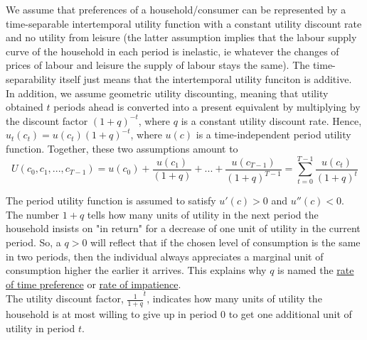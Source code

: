 \documentclass[a4paper, 12pt, reqno]{article}
\begin{document}
We assume that preferences of a household/consumer can be represented by a time-separable intertemporal utility function with a constant utility discount rate and no utility from 
leisure (the latter assumption implies that the labour supply curve of the household in each period is inelastic, ie whatever the changes of prices of labour and leisure the supply of labour stays the same). 
The time-separability itself just means that the intertemporal utility funciton is additive.  \\ 
In addition, we assume geometric utility discounting, meaning that utility obtained $t$ periods ahead is converted into a present equivalent by multiplying by the discount factor $(1 + q)^{-t}$, where $q$ 
is a constant utility discount rate. Hence, $u_t(c_t) = u(c_t)(1 + q)^{-t} $, where $u(c)$ is a time-independent period utility function. Together, these two assumptions amount to
$$ U(c_0, c_1, ..., c_{T-1}) = u(c_0) + \frac{u(c_1)}{(1+q)} + ... +  \frac{u(c_{T -1})}{(1+q)^{T-1}} = \sum_{t = 0}^{T - 1} \frac{u(c_{t})}{(1+q)^{t}} $$

The period utility function is assumed to satisfy $u'(c) > 0 $ and $u''(c) < 0 $.  \\ 
The number $ 1 + q$ tells how many units of utility in the next period the household insists on "in return" for a decrease of one unit of utility in the current period. 
So, a $q > 0$ will reflect that if the chosen level of consumption is the same in two periods, then the individual always appreciates a marginal unit of consumption higher the earlier it arrives. 
This explains why $q$ is named the \underline{rate of time preference} or \underline{rate of impatience}. \\ The utility discount factor, $\frac{1}{1+q}^t$, indicates how many units of utility the household is at most willing to give up 
in period 0 to get one additional unit of utility in period $t$.
\end{document}
